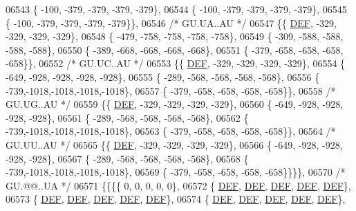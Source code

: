 \begin{DoxyCode}
06543 \{ -100, -379, -379, -379, -379\},
06544 \{ -100, -379, -379, -379, -379\},
06545 \{ -100, -379, -379, -379, -379\}\},
06546 \textcolor{comment}{/* GU.UA..AU */}
06547 \{\{  \mbox{\hyperlink{1_88_84__epars_8h_a397419fc12b37ed479c8abb9d444d843}{DEF}}, -329, -329, -329, -329\},
06548 \{ -479, -758, -758, -758, -758\},
06549 \{ -309, -588, -588, -588, -588\},
06550 \{ -389, -668, -668, -668, -668\},
06551 \{ -379, -658, -658, -658, -658\}\},
06552 \textcolor{comment}{/* GU.UC..AU */}
06553 \{\{  \mbox{\hyperlink{1_88_84__epars_8h_a397419fc12b37ed479c8abb9d444d843}{DEF}}, -329, -329, -329, -329\},
06554 \{ -649, -928, -928, -928, -928\},
06555 \{ -289, -568, -568, -568, -568\},
06556 \{ -739,-1018,-1018,-1018,-1018\},
06557 \{ -379, -658, -658, -658, -658\}\},
06558 \textcolor{comment}{/* GU.UG..AU */}
06559 \{\{  \mbox{\hyperlink{1_88_84__epars_8h_a397419fc12b37ed479c8abb9d444d843}{DEF}}, -329, -329, -329, -329\},
06560 \{ -649, -928, -928, -928, -928\},
06561 \{ -289, -568, -568, -568, -568\},
06562 \{ -739,-1018,-1018,-1018,-1018\},
06563 \{ -379, -658, -658, -658, -658\}\},
06564 \textcolor{comment}{/* GU.UU..AU */}
06565 \{\{  \mbox{\hyperlink{1_88_84__epars_8h_a397419fc12b37ed479c8abb9d444d843}{DEF}}, -329, -329, -329, -329\},
06566 \{ -649, -928, -928, -928, -928\},
06567 \{ -289, -568, -568, -568, -568\},
06568 \{ -739,-1018,-1018,-1018,-1018\},
06569 \{ -379, -658, -658, -658, -658\}\}\}\},
06570 \textcolor{comment}{/* GU.@@..UA */}
06571 \{\{\{\{    0,    0,    0,    0,    0\},
06572 \{  \mbox{\hyperlink{1_88_84__epars_8h_a397419fc12b37ed479c8abb9d444d843}{DEF}},  \mbox{\hyperlink{1_88_84__epars_8h_a397419fc12b37ed479c8abb9d444d843}{DEF}},  \mbox{\hyperlink{1_88_84__epars_8h_a397419fc12b37ed479c8abb9d444d843}{DEF}},  \mbox{\hyperlink{1_88_84__epars_8h_a397419fc12b37ed479c8abb9d444d843}{DEF}},  \mbox{\hyperlink{1_88_84__epars_8h_a397419fc12b37ed479c8abb9d444d843}{DEF}}\},
06573 \{  \mbox{\hyperlink{1_88_84__epars_8h_a397419fc12b37ed479c8abb9d444d843}{DEF}},  \mbox{\hyperlink{1_88_84__epars_8h_a397419fc12b37ed479c8abb9d444d843}{DEF}},  \mbox{\hyperlink{1_88_84__epars_8h_a397419fc12b37ed479c8abb9d444d843}{DEF}},  \mbox{\hyperlink{1_88_84__epars_8h_a397419fc12b37ed479c8abb9d444d843}{DEF}},  \mbox{\hyperlink{1_88_84__epars_8h_a397419fc12b37ed479c8abb9d444d843}{DEF}}\},
06574 \{  \mbox{\hyperlink{1_88_84__epars_8h_a397419fc12b37ed479c8abb9d444d843}{DEF}},  \mbox{\hyperlink{1_88_84__epars_8h_a397419fc12b37ed479c8abb9d444d843}{DEF}},  \mbox{\hyperlink{1_88_84__epars_8h_a397419fc12b37ed479c8abb9d444d843}{DEF}},  \mbox{\hyperlink{1_88_84__epars_8h_a397419fc12b37ed479c8abb9d444d843}{DEF}},  \mbox{\hyperlink{1_88_84__epars_8h_a397419fc12b37ed479c8abb9d444d843}{DEF}}\},

\end{DoxyCode}

